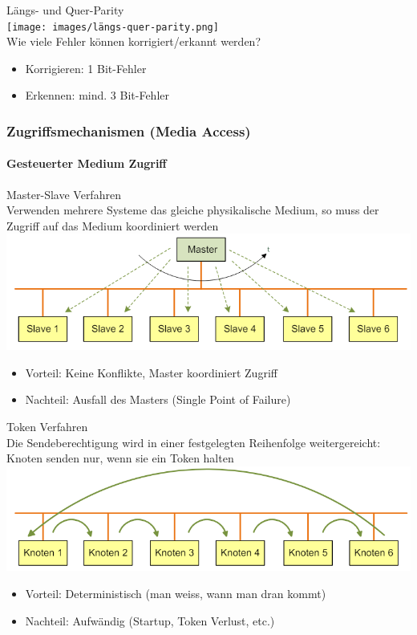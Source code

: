 \begin{concept}{Längs- und Quer-Parity}\\
        \texttt{[image: images/längs-quer-parity.png]}\\
    Wie viele Fehler können korrigiert/erkannt werden?
    \begin{itemize}
        \item Korrigieren: 1 Bit-Fehler
        \item Erkennen: mind. 3 Bit-Fehler
    \end{itemize}
\end{concept}



\subsubsection{Zugriffsmechanismen (Media Access)}

\paragraph{Gesteuerter Medium Zugriff}

\begin{definition}{Master-Slave Verfahren}\\
    Verwenden mehrere Systeme das gleiche physikalische Medium, so muss der Zugriff auf das Medium koordiniert werden\\
        \includegraphics[width=0.75\linewidth]{images/master-slave.png}
    \begin{itemize}
        \item Vorteil: Keine Konflikte, Master koordiniert Zugriff
        \item Nachteil: Ausfall des Masters (Single Point of Failure)
    \end{itemize}
\end{definition}

\begin{definition}{Token Verfahren}\\
    Die Sendeberechtigung wird in einer festgelegten Reihenfolge weitergereicht: Knoten senden nur, wenn sie ein Token halten\\
        \includegraphics[width=0.75\linewidth]{images/token-verfahren.png}
    \begin{itemize}
        \item Vorteil:  Deterministisch (man weiss, wann man dran kommt)
        \item Nachteil: Aufwändig (Startup, Token Verlust, etc.)
    \end{itemize}
\end{definition}

